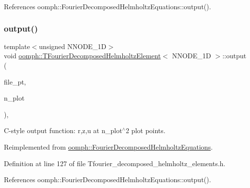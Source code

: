 References oomph\+::\+Fourier\+Decomposed\+Helmholtz\+Equations\+::output().

\mbox{\label{classoomph_1_1TFourierDecomposedHelmholtzElement_a6d354eaf73ecef7a77db246e728a7ed1}} 
\subsubsection{\texorpdfstring{output()}{output()}\hspace{0.1cm}{\footnotesize\ttfamily [4/4]}}
{\footnotesize\ttfamily template$<$unsigned N\+N\+O\+D\+E\+\_\+1D$>$ \\
void \hyperlink{classoomph_1_1TFourierDecomposedHelmholtzElement}{oomph\+::\+T\+Fourier\+Decomposed\+Helmholtz\+Element}$<$ N\+N\+O\+D\+E\+\_\+1D $>$\+::output (\begin{DoxyParamCaption}\item[{F\+I\+LE $\ast$}]{file\+\_\+pt,  }\item[{const unsigned \&}]{n\+\_\+plot }\end{DoxyParamCaption})\hspace{0.3cm}{\ttfamily [inline]}, {\ttfamily [virtual]}}



C-\/style output function\+: r,z,u at n\+\_\+plot$^\wedge$2 plot points. 



Reimplemented from \hyperlink{classoomph_1_1FourierDecomposedHelmholtzEquations_a1cd04195d40d3d411cda8f0323fc2e7b}{oomph\+::\+Fourier\+Decomposed\+Helmholtz\+Equations}.



Definition at line 127 of file Tfourier\+\_\+decomposed\+\_\+helmholtz\+\_\+elements.\+h.



References oomph\+::\+Fourier\+Decomposed\+Helmholtz\+Equations\+::output().

\mbox{\label{classoomph_1_1TFourierDecomposedHelmholtzElement_ac9683f67f96bc22aa36ac4009c97ffdd}} 
